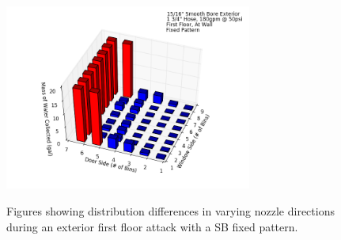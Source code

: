 \documentclass{article}
\begin{document}
\begin{figure}[ht]
\begin{tabular*}{\textwidth}{lr}
\end{tabular*}
\centering
\includegraphics[width=3.2in]{../ADD_Analysis/Figures/15-12-08_104620_Datafile_15_16in_Smooth_Bore_Exterior.png} \\
\caption{Figures showing distribution differences in varying nozzle directions during an exterior first floor attack with a SB fixed pattern.}
\label{fig:Exterior_First_Floor_Varying_Nozzle_Directions_SB_Fixed_Pattern}
\end{figure}

\clearpage
\end{document}
